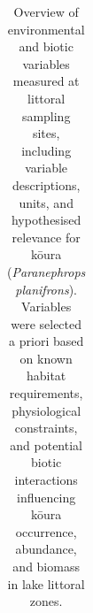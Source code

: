 \documentclass[
  12pt,
  a4paper,
  oneside]{scrbook}
\begin{document}
{

\begin{longtable}[]{@{}
  >{\raggedright\arraybackslash}p{}
  >{\raggedright\arraybackslash}p{}
  >{\raggedright\arraybackslash}p{}
  >{\raggedright\arraybackslash}p{}@{}}

\caption{\label{tbl-environmental-biotic-overview}Overview of
environmental and biotic variables measured at littoral sampling sites,
including variable descriptions, units, and hypothesised relevance for
kōura (\emph{Paranephrops planifrons}). Variables were selected a priori
based on known habitat requirements, physiological constraints, and
potential biotic interactions influencing kōura occurrence, abundance,
and biomass in lake littoral zones.}

\tabularnewline


\end{longtable}}
\end{document}
